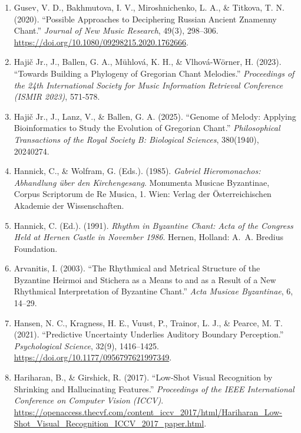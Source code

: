 \documentclass[11pt,a4paper]{article}
\begin{document}
\begin{enumerate}
 Grigorjeva, V. (2023). ``Principles of Stratification of Melodic Formulas of Old Russian Out-of-Ichos Chants (with `Opekalovo' `Sepulchral' Chants).'' \emph{St. Tikhons' University Review. Series V: Christian Art}, 50, 9-23. \url{https://doi.org/10.15382/sturv202350.9-23}.
\item
 Gusev, V. D., Bakhmutova, I. V., Miroshnichenko, L. A., \& Titkova, T. N. (2020). ``Possible Approaches to Deciphering Russian Ancient Znamenny Chant.'' \emph{Journal of New Music Research}, 49(3), 298--306. \url{https://doi.org/10.1080/09298215.2020.1762666}.
\item
 Hajič Jr., J., Ballen, G. A., Mühlová, K. H., \& Vlhová-Wörner, H. (2023). ``Towards Building a Phylogeny of Gregorian Chant Melodies.'' \emph{Proceedings of the 24th International Society for Music Information Retrieval Conference (ISMIR 2023)}, 571-578.
\item
 Hajič Jr., J., Lanz, V., \& Ballen, G. A. (2025). ``Genome of Melody: Applying Bioinformatics to Study the Evolution of Gregorian Chant.'' \emph{Philosophical Transactions of the Royal Society B: Biological Sciences}, 380(1940), 20240274.
\item
 Hannick, C., \& Wolfram, G. (Eds.). (1985). \emph{Gabriel Hieromonachos: Abhandlung über den Kirchengesang}. Monumenta Musicae Byzantinae, Corpus Scriptorum de Re Musica, 1. Wien: Verlag der Österreichischen Akademie der Wissenschaften.
\item
 Hannick, C. (Ed.). (1991). \emph{Rhythm in Byzantine Chant: Acta of the Congress Held at Hernen Castle in November 1986}. Hernen, Holland: A.~A. Bredius Foundation.
\item
 Arvanitis, I. (2003). ``The Rhythmical and Metrical Structure of the Byzantine Heirmoi and Stichera as a Means to and as a Result of a New Rhythmical Interpretation of Byzantine Chant.'' \emph{Acta Musicae Byzantinae}, 6, 14--29.
\item
 Hansen, N. C., Kragness, H. E., Vuust, P., Trainor, L. J., \& Pearce, M. T. (2021). ``Predictive Uncertainty Underlies Auditory Boundary Perception.'' \emph{Psychological Science}, 32(9), 1416--1425. \url{https://doi.org/10.1177/0956797621997349}.
\item
 Hariharan, B., \& Girshick, R. (2017). ``Low-Shot Visual Recognition by Shrinking and Hallucinating Features.'' \emph{Proceedings of the IEEE International Conference on Computer Vision (ICCV)}. \url{https://openaccess.thecvf.com/content_iccv_2017/html/Hariharan_Low-Shot_Visual_Recognition_ICCV_2017_paper.html}.

\end{enumerate}
\end{document}
